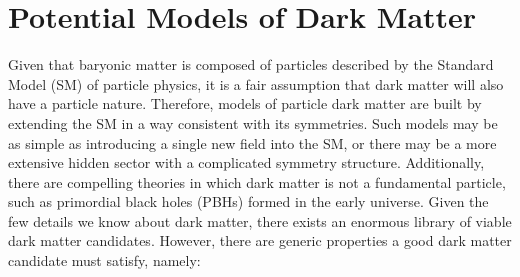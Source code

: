 \section{Potential Models of Dark Matter}
\label{ch1:sec:DM_models}

Given that baryonic matter is composed of particles described by the Standard Model (SM) of particle physics, it is a fair assumption that dark matter will also have a particle nature. Therefore, models of particle dark matter are built by extending the SM in a way consistent with its symmetries. 
Such models may be as simple as introducing a single new field into the SM, or there may be a more extensive hidden sector with a complicated symmetry structure. Additionally, there are compelling theories in which dark matter is not a fundamental particle, such as primordial black holes (PBHs) formed in the early universe. Given the few details we know about dark matter, there exists an enormous library of viable dark matter candidates. However, there are generic properties a good dark matter candidate must satisfy, namely:
